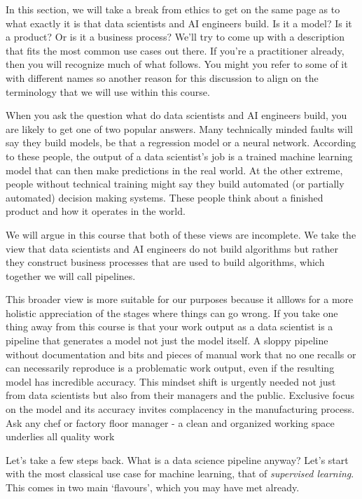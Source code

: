 \documentclass[
]{book}
\theoremstyle{definition}
\theoremstyle{definition}
\theoremstyle{definition}
\theoremstyle{definition}
\theoremstyle{remark}
\begin{document}
In this section, we will take a break from ethics to get on the same page as to what exactly it is that data scientists and AI engineers build. Is it a model? Is it a product? Or is it a business process? We'll try to come up with a description that fits the most common use cases out there. If you're a practitioner already, then you will recognize much of what follows. You might you refer to some of it with different names so another reason for this discussion to align on the terminology that we will use within this course.

When you ask the question what do data scientists and AI engineers build, you are likely to get one of two popular answers. Many technically minded faults will say they build models, be that a regression model or a neural network. According to these people, the output of a data scientist's job is a trained machine learning model that can then make predictions in the real world. At the other extreme, people without technical training might say they build automated (or partially automated) decision making systems. These people think about a finished product and how it operates in the world.

We will argue in this course that both of these views are incomplete. We take the view that data scientists and AI engineers do not build algorithms but rather they construct business processes that are used to build algorithms, which together we will call pipelines.

This broader view is more suitable for our purposes because it alllows for a more holistic appreciation of the stages where things can go wrong. If you take one thing away from this course is that your work output as a data scientist is a pipeline that generates a model not just the model itself. A sloppy pipeline without documentation and bits and pieces of manual work that no one recalls or can necessarily reproduce is a problematic work output, even if the resulting model has incredible accuracy. This mindset shift is urgently needed not just from data scientists but also from their managers and the public. Exclusive focus on the model and its accuracy invites complacency in the manufacturing process. Ask any chef or factory floor manager - a clean and organized working space underlies all quality work

Let's take a few steps back. What is a data science pipeline anyway? Let's start with the most classical use case for machine learning, that of \emph{supervised learning}. This comes in two main `flavours', which you may have met already.
\end{document}
